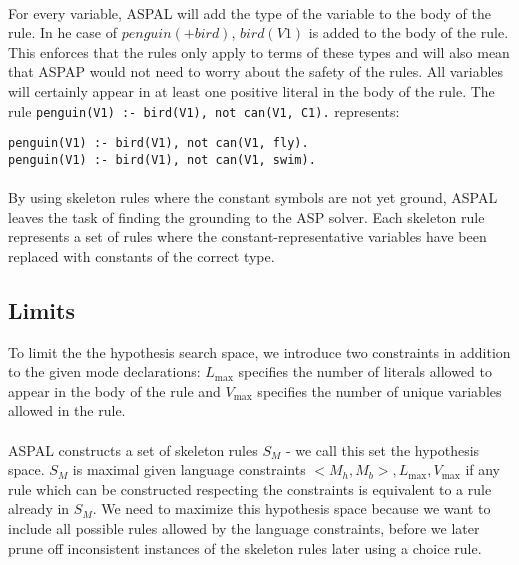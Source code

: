 \documentclass{article}
\theoremstyle{plain}
\theoremstyle{definition}
\begin{document}
\begin{multicols}{2}
\paragraph{} For every variable, ASPAL will add the type of the variable to the body of the rule. In he case of $penguin(+bird)$, $bird(V1)$ is added to the body of the rule. This enforces that the rules only apply to terms of these types and will also mean that ASPAP would not need to worry about the safety of the rules. All variables will certainly appear in at least one positive literal in the body of the rule. The rule  \lstinline{penguin(V1) :- bird(V1), not can(V1, C1).} represents:

\begin{lstlisting}
penguin(V1) :- bird(V1), not can(V1, fly).
penguin(V1) :- bird(V1), not can(V1, swim).
\end{lstlisting}

\paragraph{} By using skeleton rules where the constant symbols are not yet ground, ASPAL leaves the task of finding the grounding to the ASP solver. Each skeleton rule represents a set of rules where the constant-representative variables have been replaced with constants of the correct type.

\subsection{Limits}

To limit the the hypothesis search space, we introduce two constraints in addition to the given mode declarations: $L_\text{max}$ specifies the number of literals allowed to appear in the body of the rule and $V_\text{max}$ specifies the number of unique variables allowed in the rule.

\paragraph{} ASPAL constructs a set of skeleton rules $S_M$ - we call this set the hypothesis space. $S_M$ is maximal given language constraints $<M_h, M_b>, L_\text{max}, V_\text{max}$ if any rule which can be constructed respecting the constraints is equivalent to a rule already in $S_M$. We need to maximize this hypothesis space because we want to include all possible rules allowed by the language constraints, before we later prune off inconsistent instances of the skeleton rules later using a choice rule.


\end{multicols}
\end{document}
